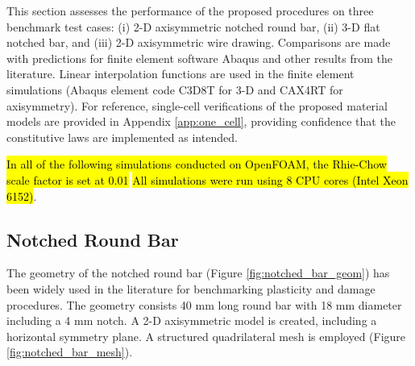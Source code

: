 \documentclass[sn-mathphys,Numbered,draft]{sn-jnl}%
\begin{document}
This section assesses the performance of the proposed procedures on three benchmark test cases: (i) 2-D axisymmetric notched round bar, (ii) 3-D flat notched bar, and (iii) 2-D axisymmetric wire drawing.
Comparisons are made with predictions for finite element software Abaqus and other results from the literature.
Linear interpolation functions are used in the finite element simulations (Abaqus element code C3D8T for 3-D and CAX4RT for axisymmetry).
For reference, single-cell verifications of the proposed material models are provided in Appendix \ref{app:one_cell}, providing confidence that the constitutive laws are implemented as intended.


\hl{In all of the following simulations conducted on OpenFOAM, the Rhie-Chow scale factor is set at 0.01}
\hl{All simulations were run using 8 CPU cores (Intel Xeon 6152)}.


\subsection{Notched Round Bar}
The geometry of the notched round bar (Figure \ref{fig:notched_bar_geom}) has been widely used in the literature \cite{cesar_de_sa_damage_2006, fincato_return_2018, vaz_aspects_2001} for benchmarking plasticity and damage procedures.
The geometry consists 40 \si{\milli\meter} long round bar with 18 \si{\milli\meter} diameter including a 4 \si{\milli\meter} notch.
A 2-D axisymmetric model is created, including a horizontal symmetry plane.
A structured quadrilateral mesh is employed (Figure \ref{fig:notched_bar_mesh}).
\end{document}
